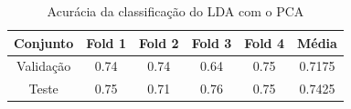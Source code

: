 \documentclass[]{abntex2}
\begin{document}
\begin{table}[H]
    \centering
    \begin{tabular}{|c|c|c|c|c|c|}
    \hline
    \rowcolor[HTML]{C0C0C0} 
    Conjunto                          & Fold 1 & Fold 2 & Fold 3 & Fold 4 & Média  \\ \hline
    \cellcolor[HTML]{C0C0C0}Validação & 0.74   & 0.74   & 0.64   & 0.75   & 0.7175  \\ \hline
    \cellcolor[HTML]{C0C0C0}Teste     & 0.75   & 0.71   & 0.76   & 0.75   & 0.7425 \\ \hline
    \end{tabular}
    \caption{Acurácia da classificação do LDA com o PCA}
    \label{tab:lda_clas}
\end{table}



\end{document}
